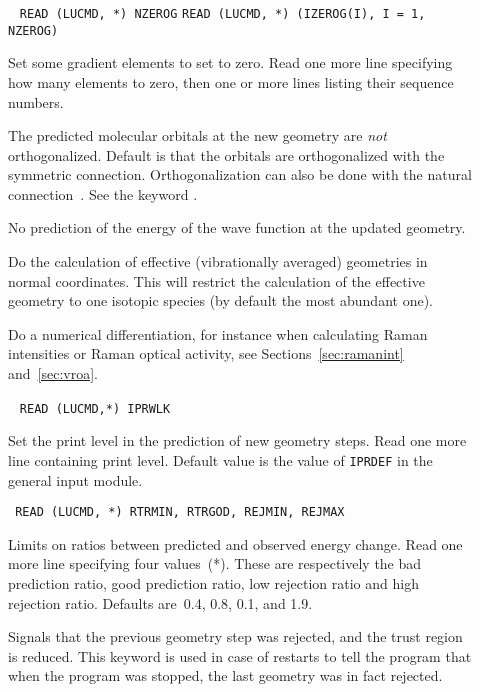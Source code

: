 \begin{description}
\item[]\verb| |\newline
\verb|READ (LUCMD, *) NZEROG|\newline
\verb|READ (LUCMD, *) (IZEROG(I), I = 1, NZEROG)|

 Set some gradient elements to set to zero.  Read
one more line specifying how many elements to zero, then one
or more lines listing their sequence numbers.

\item[] The predicted molecular orbitals at the new
geometry are {\em not} orthogonalized. Default is that the orbitals
are orthogonalized with the symmetric connection. Orthogonalization
can also be done with the natural
connection~\cite{joklbkrthpjtca90}. See the keyword .

\item[] No prediction of the energy of the wave function
at the updated geometry.

\item[] Do the calculation of effective (vibrationally
averaged) geometries in normal coordinates. This will restrict the
calculation of the effective geometry to one isotopic species (by
default the most abundant one).

\item[] Do a numerical differentiation, for instance when
calculating Raman intensities or Raman optical activity, see
Sections~\ref{sec:ramanint} and~\ref{sec:vroa}.

\item[]\verb| |\newline
\verb|READ (LUCMD,*) IPRWLK|

Set the print level in the prediction of new geometry steps.  Read one
more line containing print level. Default value is the value of
\verb|IPRDEF| in the general input module.

\item[]\verb| |\newline
\verb|READ (LUCMD, *) RTRMIN, RTRGOD, REJMIN, REJMAX|

Limits on ratios between predicted and
observed energy change.  Read one more line specifying four
values~(*).  These are respectively the bad prediction ratio, good
prediction ratio, low rejection ratio and high rejection ratio.
Defaults are~0.4, 0.8, 0.1, and 1.9.

\item[] Signals that the previous geometry step was
rejected, and the trust
region is
reduced. This keyword is
used in case of restarts to tell the program that when the program
was stopped, the last geometry was in fact rejected.


\end{description}
